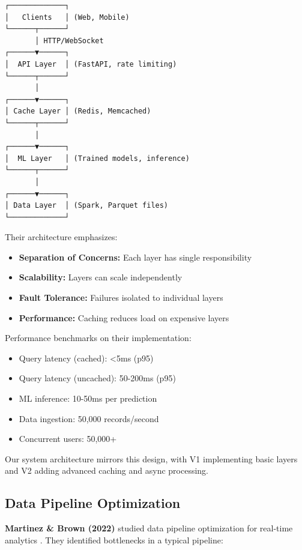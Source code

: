 \documentclass[conference]{IEEEtran}
\begin{document}
\begin{verbatim}
┌─────────────┐
│   Clients   │ (Web, Mobile)
└──────┬──────┘
       │ HTTP/WebSocket
┌──────▼──────┐
│  API Layer  │ (FastAPI, rate limiting)
└──────┬──────┘
       │
┌──────▼──────┐
│ Cache Layer │ (Redis, Memcached)
└──────┬──────┘
       │
┌──────▼──────┐
│  ML Layer   │ (Trained models, inference)
└──────┬──────┘
       │
┌──────▼──────┐
│ Data Layer  │ (Spark, Parquet files)
└─────────────┘
\end{verbatim}

Their architecture emphasizes:
\begin{itemize}
    \item \textbf{Separation of Concerns:} Each layer has single responsibility
    \item \textbf{Scalability:} Layers can scale independently
    \item \textbf{Fault Tolerance:} Failures isolated to individual layers
    \item \textbf{Performance:} Caching reduces load on expensive layers
\end{itemize}

Performance benchmarks on their implementation:
\begin{itemize}
    \item Query latency (cached): <5ms (p95)
    \item Query latency (uncached): 50-200ms (p95)
    \item ML inference: 10-50ms per prediction
    \item Data ingestion: 50,000 records/second
    \item Concurrent users: 50,000+
\end{itemize}

Our system architecture mirrors this design, with V1 implementing basic layers and V2 adding advanced caching and async processing.

\subsection{Data Pipeline Optimization}

\textbf{Martinez \& Brown (2022)} studied data pipeline optimization for real-time analytics \cite{martinez2022pipeline}. They identified bottlenecks in a typical pipeline:
\end{document}
